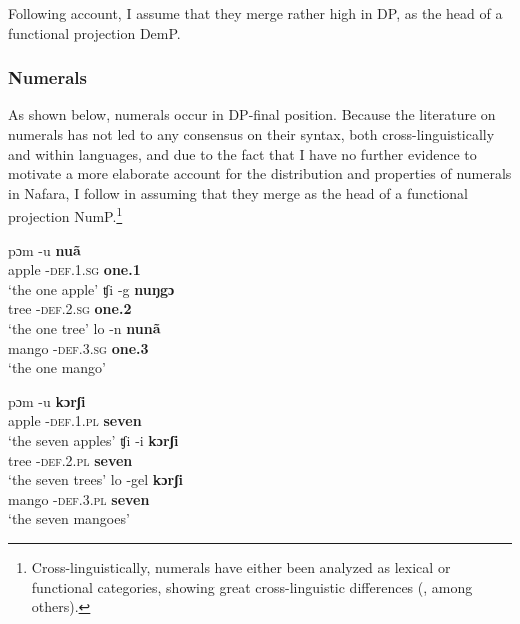\documentclass[output=paper]{langscibook}
\begin{document}
\ea\label{ex:baron:5}

\z
\z

Following  account, I assume that they merge rather high in DP, as the head of a functional projection DemP. 


\subsubsection{Numerals}
\label{sec:baron:2.1.4}
As shown below, numerals occur in DP-final position. Because the literature on numerals has not led to any consensus on their syntax, both cross-linguistically and within languages, and due to the fact that I have no further evidence to motivate a more elaborate account for the distribution and properties of numerals in Nafara, I follow \citet{Cinque2005} in assuming that they merge as the head of a functional projection NumP.\footnote{Cross-linguistically, numerals have either been analyzed as lexical or functional categories, showing great cross-linguistic differences (\citealt{Danon2012,Ionin2006}, among others).} 


\ea\label{ex:baron:6}
\ea
\gll pɔm   -u   \textbf{nuã} \\
apple -\textsc{def.1.sg}   \textbf{one.\textsc{1}}   \\
\glt ‘the one apple’
\ex
\gll ʧi   -g   \textbf{nuŋgɔ}   \\
tree -\textsc{def.2.sg}    \textbf{one.\textsc{2}}     \\
\glt ‘the one tree’
\ex
\gll lo   -n   \textbf{nunã}\\
mango -\textsc{def.3.sg}    \textbf{one.\textsc{3}}\\
\glt ‘the one mango’    
\z
\z

\ea\label{ex:baron:7}
\ea
\gll pɔm -u \textbf{kɔrʃi}   \\
apple -\textsc{def.1.pl} \textbf{seven}     \\
\glt ‘the seven apples’
\ex
\gll ʧi -i \textbf{kɔrʃi}           \\
tree -\textsc{def.2.pl} \textbf{seven}  \\
\glt ‘the seven trees’
\ex
\gll lo -gel \textbf{kɔrʃi}\\
mango -\textsc{def.3.pl} \textbf{seven}\\
\glt ‘the seven mangoes’
\z
\z
\end{document}
